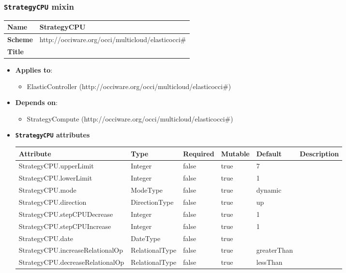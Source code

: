 \subsubsection{\texttt{StrategyCPU} mixin}
\begin{center}
\begin{tabular}{|l|l|}
  \hline
  \textbf{Name} & StrategyCPU \\
  \hline  
  \textbf{Scheme} & http://occiware.org/occi/multicloud/elasticocci\# \\
  \hline
  \textbf{Title} &  \\
  \hline
\end{tabular}
\end{center}
\begin{itemize}
\item \textbf{Applies to}:
\begin{itemize}
	\item ElasticController (http://occiware.org/occi/multicloud/elasticocci\#)
\end{itemize}
\end{itemize} 
\begin{itemize}
\item \textbf{Depends on}:
\begin{itemize}
	\item StrategyCompute (http://occiware.org/occi/multicloud/elasticocci\#)
\end{itemize}
\end{itemize}

\begin{itemize}
\item \textbf{\texttt{StrategyCPU} attributes}

\begin{tabularx}{\textwidth}{|l|l|p{1.4cm}|p{1.3cm}|l|X|}
  \hline
  \textbf{Attribute} & \textbf{Type} & \textbf{Required} & \textbf{Mutable} & \textbf{Default} & \textbf{Description} \\
  \hline  
  StrategyCPU.upperLimit & Integer & false & true & 7 &  \\
  \hline
  StrategyCPU.lowerLimit & Integer & false & true & 1 &  \\
  \hline
  StrategyCPU.mode & ModeType & false & true & dynamic &  \\
  \hline
  StrategyCPU.direction & DirectionType & false & true & up &  \\
  \hline
  StrategyCPU.stepCPUDecrease & Integer & false & true & 1 &  \\
  \hline
  StrategyCPU.stepCPUIncrease & Integer & false & true & 1 &  \\
  \hline
  StrategyCPU.date & DateType & false & true &  &  \\
  \hline
  StrategyCPU.increaseRelationalOp & RelationalType & false & true & greaterThan &  \\
  \hline
  StrategyCPU.decreaseRelationalOp & RelationalType & false & true & lessThan &  \\
  \hline
\end{tabularx}
\end{itemize}

